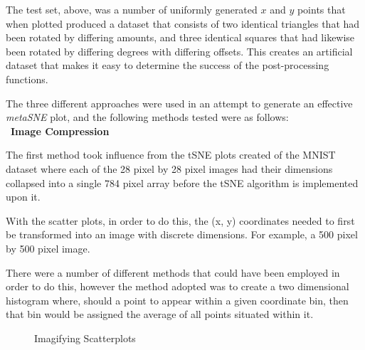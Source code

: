 \documentclass[a4paper,11pt,titlepage]{article}
\begin{document}
	The test set, above, was a number of uniformly generated $x$ and $y$ points that when plotted produced a dataset that consists of two identical triangles that had been rotated by differing amounts, and three identical squares that had likewise been rotated by differing degrees with differing offsets. This creates an artificial dataset that makes it easy to determine the success of the post-processing functions.
	\par 
	The three different approaches were used in an attempt to generate an effective \textit{metaSNE} plot, and the following methods tested were as follows:
	\\\
	\textbf{Image Compression}
	\par
	The first method took influence from the tSNE plots created of the MNIST dataset where each of the 28 pixel by 28 pixel images had their dimensions collapsed into a single 784 pixel array before the tSNE algorithm is implemented upon it.
	\par 
	With the scatter plots, in order to do this, the (x, y) coordinates needed to first be transformed into an image with discrete dimensions. For example, a 500 pixel by 500 pixel image. 
	\par 
	There were a number of different methods that could have been employed in order to do this, however the method adopted was to create a two dimensional histogram where, should a point to appear within a given coordinate bin, then that bin would be assigned the average of all points situated within it. 
	\par 
	\begin{figure}[H]
    			\caption{Imagifying Scatterplots}%
	\end{figure}	
	
\end{document}
